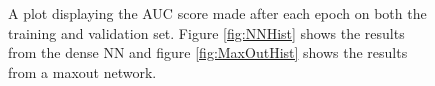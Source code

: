 \begin{figure}
    \caption{A plot displaying the \ac{AUC} score made after each epoch on both the training and validation set. 
    Figure \ref{fig:NNHist} shows the results from the dense \ac{NN} and figure \ref{fig:MaxOutHist} shows
    the results from a maxout network.}
    \label{fig:History}
\end{figure}
